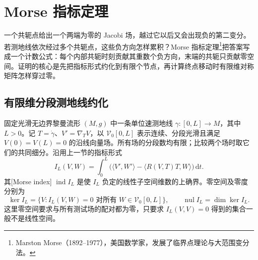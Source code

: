 
% 
% 
% 

\section{Morse 指标定理}
\label{g3:sec:0604}

一个共轭点给出一个两端为零的 Jacobi 场，越过它以后又会出现负的第二变分。若测地线依次经过多个共轭点，这些负方向怎样累积？Morse 指标定理\footnote{Marston Morse（1892--1977），美国数学家，发展了临界点理论与大范围变分法。}把答案写成一个计数公式：每个内部共轭时刻贡献其重数个负方向，末端的共轭只贡献零空间。证明的核心是先把指标形式约化到有限个节点，再计算终点移动时有限维对称矩阵怎样穿过零。

\subsection{有限维分段测地线约化}
\label{g3:subsec:0604:01}

固定光滑无边界黎曼流形 \((M,g)\) 中一条单位速测地线 \(\gamma:[0,L]\to M\)，其中 \(L>0\)。记 \(T=\dot\gamma\)、\(V'=\nabla_TV\)，以 \(\mathcal V_0[0,L]\) 表示连续、分段光滑且满足 \(V(0)=V(L)=0\) 的沿线向量场。所有场的分段数均有限；比较两个场时取它们的共同细分。沿用上一节的指标形式
\[
	I_L(V,W)=\int_0^L\bigl(\langle V',W'\rangle-\langle R(V,T)T,W\rangle\bigr)\,\mathrm dt.
\]
其[Morse index] \(\operatorname{ind}I_L\) 是使 \(I_L\) 负定的线性子空间维数的上确界。零空间及零度分别为
\[
	\ker I_L=\{V:I_L(V,W)=0\text{ 对所有 }W\in\mathcal V_0[0,L]\},
	\qquad \operatorname{nul}I_L=\dim\ker I_L.
\]
这里零空间要求与所有测试场的配对都为零，只要求 \(I_L(V,V)=0\) 得到的集合一般不是线性空间。

